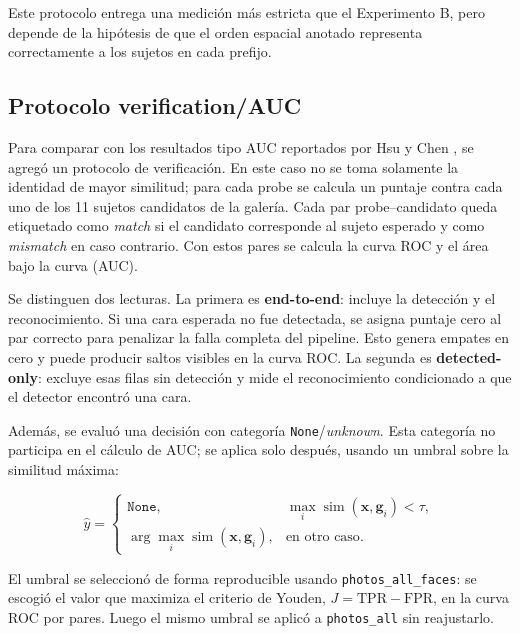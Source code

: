 \documentclass[11pt]{article}
\begin{document}
Este protocolo entrega una medici\'on m\'as estricta que el Experimento B, pero depende de la hip\'otesis de que el orden espacial anotado representa correctamente a los sujetos en cada prefijo.

\subsection{Protocolo verification/AUC}

Para comparar con los resultados tipo AUC reportados por Hsu y Chen \cite{hsu2015issues}, se agreg\'o un protocolo de verificaci\'on. En este caso no se toma solamente la identidad de mayor similitud; para cada probe se calcula un puntaje contra cada uno de los 11 sujetos candidatos de la galer\'ia. Cada par probe--candidato queda etiquetado como \textit{match} si el candidato corresponde al sujeto esperado y como \textit{mismatch} en caso contrario. Con estos pares se calcula la curva ROC y el \'area bajo la curva (AUC).

Se distinguen dos lecturas. La primera es \textbf{end-to-end}: incluye la detecci\'on y el reconocimiento. Si una cara esperada no fue detectada, se asigna puntaje cero al par correcto para penalizar la falla completa del pipeline. Esto genera empates en cero y puede producir saltos visibles en la curva ROC. La segunda es \textbf{detected-only}: excluye esas filas sin detecci\'on y mide el reconocimiento condicionado a que el detector encontr\'o una cara.

Adem\'as, se evalu\'o una decisi\'on con categor\'ia \texttt{None}/\textit{unknown}. Esta categor\'ia no participa en el c\'alculo de AUC; se aplica solo despu\'es, usando un umbral sobre la similitud m\'axima:

\begin{equation}
    \hat{y} =
    \begin{cases}
    \texttt{None}, & \max_i \operatorname{sim}(\mathbf{x}, \mathbf{g}_i) < \tau,\\
    \arg\max_i \operatorname{sim}(\mathbf{x}, \mathbf{g}_i), & \text{en otro caso}.
    \end{cases}
\end{equation}

El umbral se seleccion\'o de forma reproducible usando \texttt{photos\_all\_faces}: se escogi\'o el valor que maximiza el criterio de Youden, $J = \text{TPR} - \text{FPR}$, en la curva ROC por pares. Luego el mismo umbral se aplic\'o a \texttt{photos\_all} sin reajustarlo.
\end{document}
